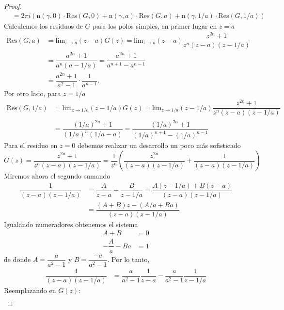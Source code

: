 \documentclass{article}
\begin{document}
\begin{proof}
\begin{align*}
                                                & = 2 \pi i \left(\text{n}(\gamma, 0) \cdot \text{Res}(G, 0) + \text{n}(\gamma, a) \cdot \text{Res}(G, a) + \text{n}(\gamma, 1/a) \cdot \text{Res}(G, 1/a)\right)
    \end{align*}
    Calculemos los residuos de \( G \) para los polos simples, en primer lugar en \( z = a \) \begin{align*}
        \text{Res}(G, a) & = \text{lim}_{z \to a} (z-a)G(z) = \text{lim}_{z \to a} (z-a) \dfrac{z^{2n} + 1}{z^n (z - a)(z - 1/a)} \\
                         & = \dfrac{a^{2n} + 1}{a^n (a - 1/a)} = \dfrac{a^{2n} + 1}{a^{n+1} - a^{n-1}}                            \\
                         & = \dfrac{a^{2n} + 1}{a^2 - 1} \cdot \dfrac{1}{a^{n-1}}.
    \end{align*}
    Por otro lado, para \( z = 1/a \) \begin{align*}
        \text{Res}(G, 1/a) & = \text{lim}_{z \to 1/a} (z - 1/a) G(z) = \text{lim}_{z \to 1/a} (z - 1/a) \dfrac{z^{2n} + 1}{z^n (z - a)(z - 1/a)} \\
                           & = \dfrac{{(1/a)}^{2n} + 1}{ {(1/a)}^n (1/a - a) } = \dfrac{ {(1/a)}^{2n} + 1 }{ {(1/a)}^{n+1} - {(1/a)}^{n-1} }
    \end{align*}
    Para el residuo en \( z = 0 \) debemos realizar un desarrollo un poco más sofisticado \[
        G(z) = \dfrac{z^{2n} + 1}{z^n (z-a)(z-1/a)} = \dfrac{1}{z^n} \left( \dfrac{z^{2n}}{(z-a)(z-1/a)} + \dfrac{1}{(z-a)(z-1/a)} \right)
    \]
    Miremos ahora el segundo sumando \begin{align*}
        \dfrac{1}{(z-a)(z-1/a)} & = \dfrac{A}{z-a} + \dfrac{B}{z-1/a} = \dfrac{A(z - 1/a) + B(z - a)}{(z-a)(z-1/a)} \\
                                & = \dfrac{(A+B)z - (A/a + Ba)}{(z-a)(z-1/a)}
    \end{align*}
    Igualando numeradores obtenemos el sistema \begin{align*}
        A + B              & = 0 \\
        -\dfrac{A}{a} - Ba & = 1
    \end{align*}
    de donde \( A = \dfrac{a}{a^2 - 1} \) y \( B = \dfrac{-a}{a^2 - 1} \). Por lo tanto, \begin{align*}
        \dfrac{1}{(z-a)(z-1/a)} & = \dfrac{a}{a^2 - 1} \dfrac{1}{z-a} - \dfrac{a}{a^2 - 1} \dfrac{1}{z-1/a}
    \end{align*}
    Reemplazando en \( G(z) \): \begin{align*}

\end{align*}
\end{proof}
\end{document}
